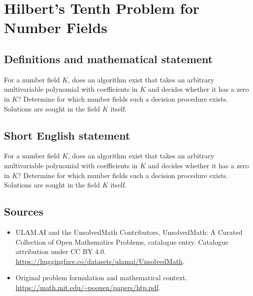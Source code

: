 \documentclass[11pt]{article}
\begin{document}
\section{Hilbert's Tenth Problem for Number Fields}\label{statement}

\subsection{Definitions and mathematical statement}
For a number field $K$, does an algorithm exist that takes an arbitrary multivariable polynomial with coefficients in $K$ and decides whether it has a zero in $K$? Determine for which number fields such a decision procedure exists. Solutions are sought in the field $K$ itself.
\subsection{Short English statement}
For a number field $K$, does an algorithm exist that takes an arbitrary multivariable polynomial with coefficients in $K$ and decides whether it has a zero in $K$? Determine for which number fields such a decision procedure exists. Solutions are sought in the field $K$ itself.
\subsection{Sources}
\begin{itemize}
\item[\hypertarget{source:statement:1}{S1}] ULAM.AI and the UnsolvedMath Contributors, UnsolvedMath: A Curated Collection of Open Mathematics Problems, catalogue entry. Catalogue attribution under CC BY 4.0.
\url{https://huggingface.co/datasets/ulamai/UnsolvedMath}.
\item[\hypertarget{source:statement:2}{S2}] Original problem formulation and mathematical context.
\url{https://math.mit.edu/~poonen/papers/htp.pdf}.
\end{itemize}
\label{end:statement}
\end{document}
